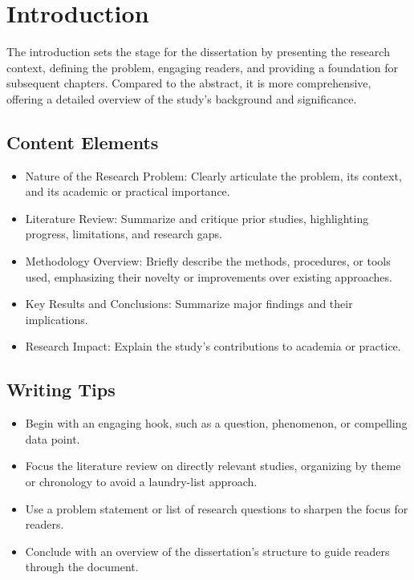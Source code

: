 \chapter{Introduction}

 The introduction sets the stage for the dissertation by presenting the research context, defining the problem, engaging readers, and providing a foundation for subsequent chapters. Compared to the abstract, it is more comprehensive, offering a detailed overview of the study’s background and significance.

\section{Content Elements}
\begin{itemize}
    \item Nature of the Research Problem: Clearly articulate the problem, its context, and its academic or practical importance.
    \item Literature Review: Summarize and critique prior studies, highlighting progress, limitations, and research gaps.
    \item Methodology Overview: Briefly describe the methods, procedures, or tools used, emphasizing their novelty or improvements over existing approaches.
    \item Key Results and Conclusions: Summarize major findings and their implications.
    \item Research Impact: Explain the study’s contributions to academia or practice.
\end{itemize}

\section{Writing Tips}
\begin{itemize}
    \item Begin with an engaging hook, such as a question, phenomenon, or compelling data point.
    \item Focus the literature review on directly relevant studies, organizing by theme or chronology to avoid a laundry-list approach.
    \item Use a problem statement or list of research questions to sharpen the focus for readers.
    \item Conclude with an overview of the dissertation’s structure to guide readers through the document.

\end{itemize}
